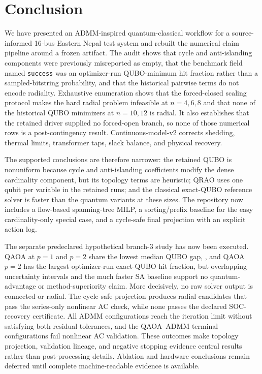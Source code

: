 \documentclass[5p,twocolumn,number,sort&compress,nopreprintline]{elsarticle}
\begin{document}
\section{Conclusion}
\label{sec:conclusion}

We have presented an ADMM-inspired quantum-classical workflow for a
source-informed 16-bus Eastern Nepal test system and rebuilt the
numerical claim pipeline around a frozen artifact. The audit shows
that cycle and anti-islanding components were previously misreported as
empty, that the benchmark field named \texttt{success} was an
optimizer-run QUBO-minimum hit fraction rather than a sampled-bitstring
probability, and that the
historical pairwise terms do not encode radiality. Exhaustive enumeration
shows that the forced-closed scaling protocol makes the hard radial
problem infeasible at $n=4,6,8$ and that none of the historical QUBO
minimizers at $n=10,12$ is radial.
It also establishes that the retained driver supplied no forced-open
branch, so none of those numerical rows is a post-contingency result.
Continuous-model-v2 corrects shedding, thermal
limits, transformer taps, slack balance, and physical recovery.

The supported conclusions are therefore narrower: the retained QUBO
is nonuniform because cycle and anti-islanding coefficients modify the
dense cardinality component, but its topology terms are heuristic;
QRAO uses one qubit per variable in the retained runs; and the classical
exact-QUBO reference solver is faster than the quantum variants at these sizes.
The repository now includes a flow-based spanning-tree MILP, a
sorting/prefix baseline for the easy cardinality-only special case, and
a cycle-safe final projection with an explicit action log.

The separate predeclared hypothetical branch-3 study has now been
executed. QAOA at $p=1$ and $p=2$ share the lowest median QUBO gap,
\PostContingencyBestMedianGap{}, and QAOA $p=2$ has the largest
optimizer-run exact-QUBO hit fraction, but overlapping uncertainty
intervals and the much faster SA baseline support no quantum-advantage
or method-superiority claim. More decisively, no raw solver output is
connected or radial. The cycle-safe projection produces radial
candidates that pass the series-only nonlinear AC check, while none
passes the declared SOC-recovery certificate. All ADMM configurations
reach the iteration limit without satisfying both residual tolerances,
and the QAOA--ADMM terminal configurations fail nonlinear AC validation.
These outcomes make topology projection, validation lineage, and
negative stopping evidence central results rather than post-processing
details. Ablation and hardware conclusions remain deferred until
complete machine-readable evidence is available.
\end{document}

